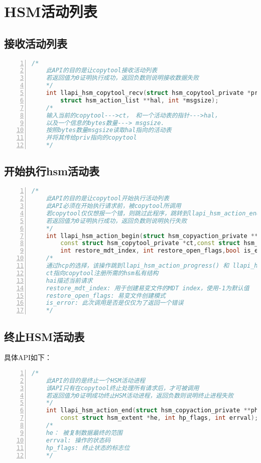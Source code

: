 \section{HSM活动列表}

\subsection{接收活动列表}

\begin{lstlisting}[language={c++},numbers=left]
    /*  
    此API的目的是让copytool接收活动列表
    若返回值为0证明执行成功，返回负数则说明接收数据失败 
    */
    int llapi_hsm_copytool_recv(struct hsm_copytool_private *priv,
        struct hsm_action_list **hal, int *msgsize);
    /* 
    输入当前的copytool--->ct， 和一个活动表的指针--->hal，
    以及一个信息的bytes数量---> msgsize.
    按照bytes数量msgsize读取hal指向的活动表
    并将其传给priv指向的copytool
    */
\end{lstlisting}

\subsection{开始执行hsm活动表}

\begin{lstlisting}[language={c++},numbers=left]
    /*  
    此API的目的是让copytool开始执行活动列表
    此API必须在开始执行请求前，被copytool所调用
    若copytool仅仅想报一个错，则跳过此程序，跳转到llapi_hsm_action_end()
    若返回值为0证明执行成功，返回负数则说明执行失败 
    */
    int llapi_hsm_action_begin(struct hsm_copyaction_private **phcp,
        const struct hsm_copytool_private *ct,const struct hsm_action_item *hai,
        int restore_mdt_index, int restore_open_flags,bool is_error);
    /* 
    通过hcp的选择，该操作跳到llapi_hsm_action_progress() 和 llapi_hsm_action_end()
    ct指向copytool注册所需的hsm私有结构
    hai描述当前请求
    restore_mdt_index: 用于创建易变文件的MDT index，使用-1为默认值
    restore_open_flags: 易变文件创建模式
    is_error: 此次调用是否是仅仅为了返回一个错误
    */
\end{lstlisting}


\subsection{终止HSM活动表}
具体API如下：
\begin{lstlisting}[language={c++},numbers=left]
    /*  
    此API的目的是终止一个HSM活动进程
    该API只有在copytool终止处理所有请求后，才可被调用
    若返回值为0证明成功终止HSM活动进程，返回负数则说明终止进程失败 
    */
    int llapi_hsm_action_end(struct hsm_copyaction_private **phcp,
        const struct hsm_extent *he, int hp_flags, int errval);
    /*  
    he： 被复制数据最终的范围
    errval: 操作的状态码
    hp_flags: 终止状态的标志位
    */
\end{lstlisting}

